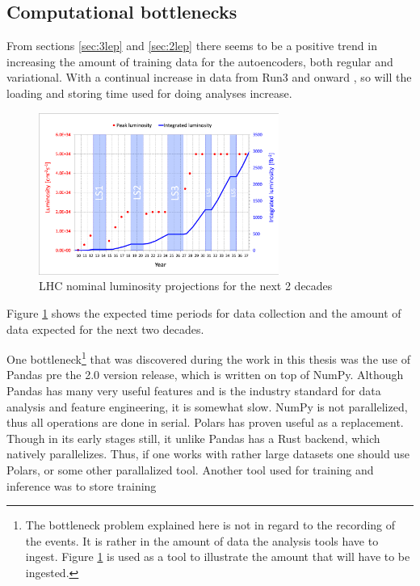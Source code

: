 \subsection*{Computational bottlenecks}
From sections \ref{sec:3lep} and \ref{sec:2lep} there seems to be a positive trend in increasing the amount 
of training data for the autoencoders, both regular and variational. With a continual increase in data from 
Run3 and onward \cite{LHC_int_lum}, so will the loading and storing time used for doing analyses increase. 

\begin{figure}[H]
    \caption[LHC nominal luminosity projections]{LHC nominal luminosity projections for the next 2 decades}
    \label{fig:lhc_nom}
    \centering
    \includegraphics[width=0.7\textwidth]{Figures/atlas/LHC-nominal-lumi-projection.png}
\end{figure}
Figure \ref{fig:lhc_nom} shows the expected time periods for data collection and the amount of data expected for 
the next two decades. \par
One bottleneck\footnote{The bottleneck problem explained here is not in regard to the recording of the events. 
It is rather in the amount of data the analysis tools have to ingest. Figure \ref{fig:lhc_nom} is used as a tool
to illustrate the amount that will have to be ingested. } that was discovered during the work in this thesis was the use of Pandas pre the 2.0 version release, which is 
written on top of NumPy. Although Pandas has many very useful features and is the industry standard for 
data analysis and feature engineering, it is somewhat slow. NumPy is not parallelized, thus all operations are 
done in serial. Polars has proven useful as a replacement. Though in its early stages still, it unlike Pandas 
has a Rust backend, which natively parallelizes. Thus, if one works with rather large datasets one should use
Polars, or some other parallalized tool. Another tool used for training and inference was to store training 
